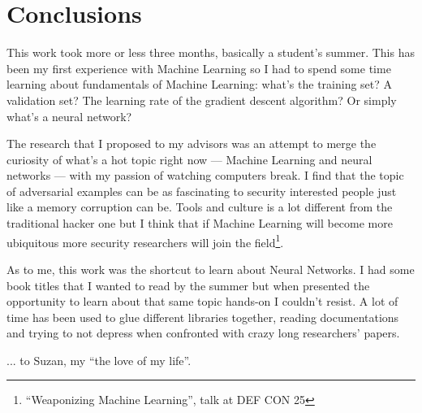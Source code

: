\chapter{Conclusions}

This work took more or less three months, basically a student's summer.
This has been my first experience with Machine Learning so I had to
spend some time learning about fundamentals of Machine Learning: what's
the training set? A validation set? The learning rate of the gradient
descent algorithm? Or simply what's a neural network?

The research that I proposed to my advisors was an attempt to merge the
curiosity of what's a hot topic right now --- Machine Learning and
neural networks --- with my passion of watching computers break. I find
that the topic of adversarial examples can be as fascinating to
security interested people just like a memory corruption can be. Tools
and culture is a lot different from the traditional hacker one but I
think that if Machine Learning will become more ubiquitous more
security researchers will join the field\footnote{``Weaponizing Machine
  Learning'', talk at DEF CON 25}.

As to me, this work was the shortcut to learn about Neural Networks. I
had some book titles that I wanted to read by the summer but when
presented the opportunity to learn about that same topic hands-on I
couldn't resist. A lot of time has been used to glue different
libraries together, reading documentations and trying to not depress
when confronted with crazy long researchers' papers.

... to Suzan, my ``the love of my life''.
